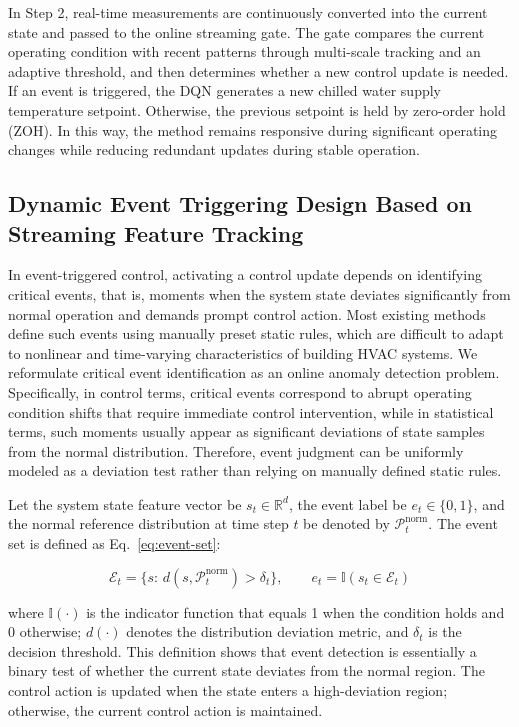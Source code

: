 ﻿\documentclass[preprint,12pt,number]{elsarticle}
\begin{document}
In Step 2, real-time measurements are continuously converted into the current state and passed to the online streaming gate. The gate compares the current operating condition with recent patterns through multi-scale tracking and an adaptive threshold, and then determines whether a new control update is needed. If an event is triggered, the DQN generates a new chilled water supply temperature setpoint. Otherwise, the previous setpoint is held by zero-order hold (ZOH). In this way, the method remains responsive during significant operating changes while reducing redundant updates during stable operation.

\subsection{Dynamic Event Triggering Design Based on Streaming Feature Tracking}\label{dynamic-event-triggering-design-based-on-streaming-feature-tracking}

In event-triggered control, activating a control update depends on identifying critical events, that is, moments when the system state deviates significantly from normal operation and demands prompt control action. Most existing methods define such events using manually preset static rules, which are difficult to adapt to nonlinear and time-varying characteristics of building HVAC systems. We reformulate critical event identification as an online anomaly detection problem. Specifically, in control terms, critical events correspond to abrupt operating condition shifts that require immediate control intervention, while in statistical terms, such moments usually appear as significant deviations of state samples from the normal distribution. Therefore, event judgment can be uniformly modeled as a deviation test rather than relying on manually defined static rules.

Let the system state feature vector be \(s_t\in\mathbb{R}^d\), the event label be \(e_t\in\{0,1\}\), and the normal reference distribution at time step \(t\) be denoted by \(\mathcal{P}^{\text{norm}}_t\). The event set is defined as Eq.~\eqref{eq:event-set}:

\[
\mathcal{E}_t=\{s:\,d(s,\mathcal{P}^{\text{norm}}_t)>\delta_t\},\qquad
e_t=\mathbb{I}(s_t\in\mathcal{E}_t) \tag{1}\label{eq:event-set}
\]

\noindent where \(\mathbb{I}(\cdot)\) is the indicator function that equals 1 when the condition holds and 0 otherwise; \(d(\cdot)\) denotes the distribution deviation metric, and \(\delta_t\) is the decision threshold. This definition shows that event detection is essentially a binary test of whether the current state deviates from the normal region. The control action is updated when the state enters a high-deviation region; otherwise, the current control action is maintained.
\end{document}
